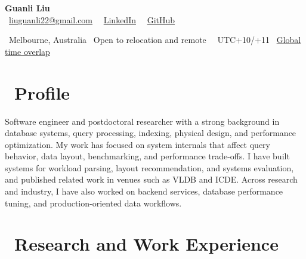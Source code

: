 \documentclass{resume}
\begin{document}

{\LARGE \textbf{Guanli Liu}}\\[-0.2em]
\faEnvelope\ \href{mailto:liuguanli22@gmail.com}{liuguanli22@gmail.com} 
\textperiodcentered\ 
\faLinkedin\ \href{https://www.linkedin.com/in/guanli-liu-11353058/}{LinkedIn} \textperiodcentered\ 
\faGithub\ \href{https://github.com/Liuguanli}{GitHub}

\faMapMarker\ Melbourne, Australia \textperiodcentered\ Open to relocation and remote \textperiodcentered\ 
\faClockO\  UTC+10/+11 \textperiodcentered\ 
\href{https://www.worldtimebuddy.com/?lid=5808079,5128581,5809844,1816670,2158177&h=2158177&hf=1}{Global time overlap \faExternalLink}
\vspace{0.4em}



\section{\faUser\ \textbf{Profile}}
Software engineer and postdoctoral researcher with a strong background in database systems, query processing, indexing, physical design, and performance optimization. My work has focused on system internals that affect query behavior, data layout, benchmarking, and performance trade-offs. I have built systems for workload parsing, layout recommendation, and systems evaluation, and published related work in venues such as VLDB and ICDE. Across research and industry, I have also worked on backend services, database performance tuning, and production-oriented data workflows.



\section{\faUsers\ \textbf{Research and Work Experience}}

\end{document}
